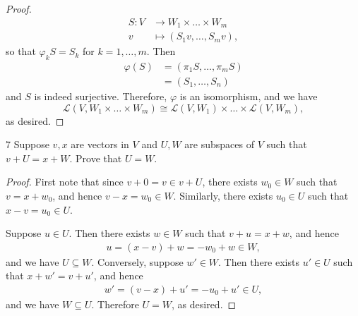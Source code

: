 \documentclass[11pt]{extarticle}
\newenvironment{problem}[1]{\begin{prob*}{#1}{}}{\end{prob*}}
\newcommand{\Hom}{\mathcal{L}}
\begin{document}
\begin{proof}
\begin{align*}
S: V &\to W_1\times \dots \times W_m\\
    v &\mapsto (S_1v,\dots, S_mv),
\end{align*}
so that $\varphi_k S = S_k$ for $k = 1,\dots, m$.  Then
\begin{align*}
\varphi(S) &= (\pi_1S, \dots, \pi_mS)\\
&= (S_1,\dots, S_n)
\end{align*}
and $S$ is indeed surjective.  Therefore, $\varphi$ is an isomorphism, and we have 
\begin{equation*}
\Hom(V, W_1\times \dots \times W_m)\cong\Hom(V, W_1)\times \dots \times \Hom(V, W_m), 
\end{equation*}
as desired.
\end{proof}

\begin{problem}{7}
Suppose $v,x$ are vectors in $V$ and $U,W$ are subspaces of $V$ such that $v + U = x + W$.  Prove that $U = W$.
\end{problem}
\begin{proof}
First note that since $v + 0 = v\in v + U$, there exists $w_0\in W$ such that $v = x + w_0$, and hence $v - x = w_0\in W$.  Similarly, there exists $u_0\in U$ such that $x - v = u_0 \in U$.
\par Suppose $u\in U$.  Then there exists $w\in W$ such that $v + u = x + w$, and hence
\begin{align*}
u = (x - v) + w = -w_0 + w \in W,
\end{align*}
and we have $U \subseteq W$.  Conversely, suppose $w' \in W$.  Then there exists $u'\in U$ such that $x + w' = v + u'$, and hence
\begin{align*}
w' = (v - x) + u' = -u_0 + u'\in U,
\end{align*}
and we have $W\subseteq U$.  Therefore $U = W$, as desired.
\end{proof}
\end{document}

